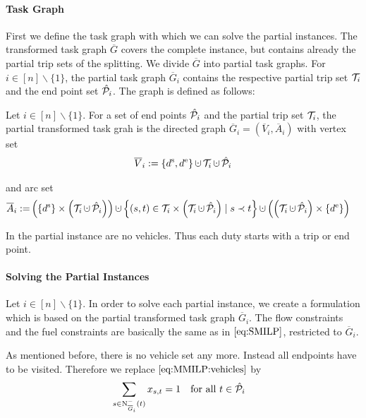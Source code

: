 \paragraph{Task Graph} \parfill

First we define the task graph with which we can solve the partial instances. The transformed task graph $\overline{G}$ covers the complete instance, but contains already the partial trip sets of the splitting. We divide $\overline{G}$ into partial task graphs. For ${i\in[n]\backslash\{1\}}$, the partial task graph $\overline{G}_i$ contains the respective partial trip set $\mathcal{T}_i$ and the end point set $\hat{\mathcal{P}}_i$. The graph is defined as follows:

\begin{definition}

Let ${i\in[n]\backslash\{1\}}$. For a set of end points $\hat{\mathcal{P}}_i$ and the partial trip set $\mathcal{T}_i$, the partial transformed task grah is the directed graph ${\overline{G}_i=\left(\overline{V}_i,\overline{A}_i\right)}$ with vertex set
\begin{align*}
	\overline{V}_i := \left\{\ds,\de\right\}\cupdot\Ti\cupdot\Phat_i
\end{align*}

and arc set
\begin{align*}
	\overline{A}_i := & \left(\left\{\ds\right\}\times\left(\Ti\cupdot\Phat_i\right)\right)\cupdot\left\{(s,t)\in\Ti\times\left(\Ti\cupdot\Phat_i\right)\mid s\prec t\right\} \cupdot\left(\left(\Ti\cupdot\Phat_i\right)\times\left\{\de\right\}\right)
\end{align*}

\end{definition}

In the partial instance are no vehicles. Thus each duty starts with a trip or end point.

\paragraph{Solving the Partial Instances} \parfill

Let ${i\in[n]\backslash\{1\}}$. In order to solve each partial instance, we create a formulation which is based on the partial transformed task graph $\overline{G}_i$. The flow constraints and the fuel constraints are basically the same as in $\eqref{eq:SMILP}$, restricted to $\overline{G}_i$. 

As mentioned before, there is no vehicle set any more. Instead all endpoints have to be visited. Therefore we replace $\eqref{eq:MMILP:vehicles}$ by
\begin{align}
	& \sum_{s\in\operatorname{N}_{\overline{G}_i}^-(t)} x_{s,t} = 1 && \text{for all } t\in\hat{\mathcal{P}}_i \label{eq:CMILP:start_end_points}
\end{align}

